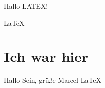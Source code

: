 \documentclass{article}
\begin{document}
Hallo LATEX!  

\LaTeX 
\section{Ich war hier}
Hallo Sein, grüße Marcel
\huge
\LaTeX 
   
\end{document}
